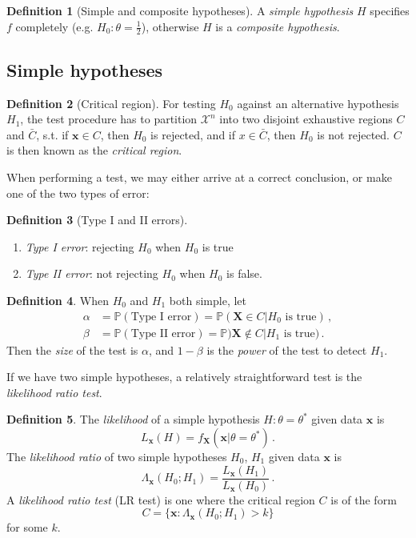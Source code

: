 \documentclass[a4paper,11pt]{article}
\theoremstyle{definition}
\newtheorem*{defn}{Definition}
\numberwithin{equation}{section}
\begin{document}
\begin{defn}[Simple and composite hypotheses]
A \emph{simple hypothesis} $H$ specifies $f$ completely (e.g. $H_0:\theta=\frac{1}{2}$), otherwise $H$ is a \emph{composite hypothesis}.
\end{defn}

\subsection{Simple hypotheses}

\begin{defn}[Critical region]
For testing $H_0$ against an alternative hypothesis $H_1$, the test procedure has to partition $\mathcal{X}^n$ into two disjoint exhaustive regions $C$ and $\bar{C}$, s.t. if $\mathbf{x}\in C$, then $H_0$ is rejected, and if $x\in \bar{C}$, then $H_0$ is not rejected. $C$ is then known as the \emph{critical region}.
\end{defn}

When performing a test, we may either arrive at a correct conclusion, or make one of the two types of error:

\begin{defn}[Type I and II errors]
\leavevmode
\begin{enumerate}
    \item \emph{Type I error}: rejecting $H_0$ when $H_0$ is true
    \item \emph{Type II error}: not rejecting $H_0$ when $H_0$ is false.
\end{enumerate}
\end{defn}

\begin{defn}
When $H_0$ and $H_1$ both simple, let
\begin{align*}
    \alpha&=\mathbb{P}(\text{Type I error})=\mathbb{P}(\mathbf{X}\in C|H_0\text{ is true})\,,\\
    \beta&=\mathbb{P}(\text{Type II error})=\mathbb{P})\mathbf{X}\not\in C|H_1\text{ is true})\,.
\end{align*}
Then the \emph{size} of the test is $\alpha$, and $1-\beta$ is the \emph{power} of the test to detect $H_1$.
\end{defn}

If we have two simple hypotheses, a relatively straightforward test is the \emph{likelihood ratio test}.

\begin{defn}
The \emph{likelihood} of a simple hypothesis $H:\theta=\theta^*$ given data $\mathbf{x}$ is
\[
L_\mathbf{x}(H)=f_\mathbf{X}(\mathbf{x}|\theta=\theta^*)\,.
\]
The \emph{likelihood ratio} of two simple hypotheses $H_0$, $H_1$ given data $\mathbf{x}$ is
\[
\Lambda_\mathbf{x}(H_0;H_1)=\frac{L_\mathbf{x}(H_1)}{L_\mathbf{x}(H_0)}\,.
\]
A \emph{likelihood ratio test} (LR test) is one where the critical region $C$ is of the form
\[
C=\{\mathbf{x}:\Lambda_\mathbf{x}(H_0;H_1)>k\}
\]
for some $k$.
\end{defn}
\end{document}
